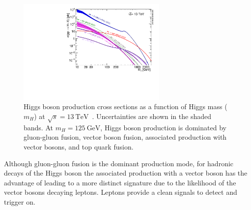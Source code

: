 \begin{figure}[!htbp]
  \centering
  \includegraphics[width=0.65\textwidth]{chapters/1.theory/figs/plotAll_13tev_BSM_sqrt.pdf}
  \caption{
    Higgs boson production cross sections as a function of Higgs mass ($m_H$) at $\sqrt{s} = \SI{13}{\TeV}$~\cite{deFlorian:2016spz}.
    Uncertainties are shown in the shaded bands.
    At $m_H = \SI{125}{\GeV}$, Higgs boson production is dominated by gluon-gluon fusion, vector boson fusion, associated production with vector bosons, and top quark fusion.
  }
  \label{fig:higgs_production_xs}
\end{figure}

Although gluon-gluon fusion is the dominant production mode, for hadronic decays of the Higgs boson the associated production with a vector boson has the advantage of leading to a more distinct signature due to the likelihood of the vector bosons decaying leptons.
Leptons provide a clean signals to detect and trigger on.


